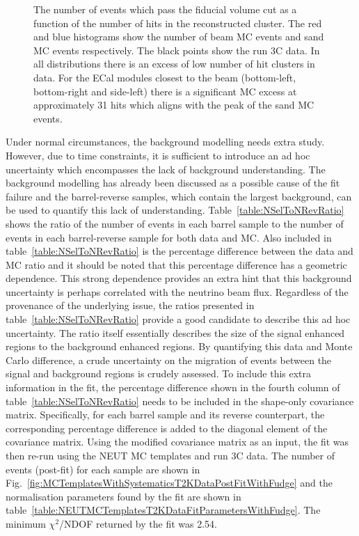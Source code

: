 \begin{figure}
\begin{minipage}{.5\linewidth}
\end{minipage}\par\medskip
\caption{The number of events which pass the fiducial volume cut as a function of the number of hits in the reconstructed cluster.  The red and blue histograms show the number of beam MC events and sand MC events respectively.  The black points show the run 3C data.  In all distributions there is an excess of low number of hit clusters in data.  For the ECal modules closest to the beam (bottom-left, bottom-right and side-left) there is a significant MC excess at approximately 31 hits which aligns with the peak of the sand MC events.}
\label{fig:ClusterNHitsCutLevelGT0}
\end{figure}
\newline
\newline
Under normal circumstances, the background modelling needs extra study.  However, due to time constraints, it is sufficient to introduce an ad hoc uncertainty which encompasses the lack of background understanding.  The background modelling has already been discussed as a possible cause of the fit failure and the barrel-reverse samples, which contain the largest background, can be used to quantify this lack of understanding.  Table~\ref{table:NSelToNRevRatio} shows the ratio of the number of events in each barrel sample to the number of events in each barrel-reverse sample for both data and MC.  Also included in table~\ref{table:NSelToNRevRatio} is the percentage difference between the data and MC ratio and it should be noted that this percentage difference has a geometric dependence.  This strong dependence provides an extra hint that this background uncertainty is perhaps correlated with the neutrino beam flux.  Regardless of the provenance of the underlying issue, the ratios presented in table~\ref{table:NSelToNRevRatio} provide a good candidate to describe this ad hoc uncertainty.  The ratio itself essentially describes the size of the signal enhanced regions to the background enhanced regions.  By quantifying this data and Monte Carlo difference, a crude uncertainty on the migration of events between the signal and background regions is crudely assessed.  To include this extra information in the fit, the percentage difference shown in the fourth column of table~\ref{table:NSelToNRevRatio} needs to be included in the shape-only covariance matrix.  Specifically, for each barrel sample and its reverse counterpart, the corresponding percentage difference is added to the diagonal element of the covariance matrix.  Using the modified covariance matrix as an input, the fit was then re-run using the NEUT MC templates and run 3C data.  The number of events (post-fit) for each sample are shown in Fig.~\ref{fig:MCTemplatesWithSystematicsT2KDataPostFitWithFudge} and the normalisation parameters found by the fit are shown in table~\ref{table:NEUTMCTemplatesT2KDataFitParametersWithFudge}.  The minimum $\chi^2$/NDOF returned by the fit was 2.54.

